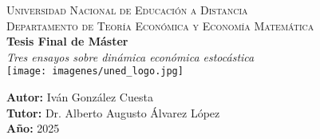 \documentclass[a4paper,12pt]{article}
\begin{document}
	
	\begin{titlepage}
		\centering
		
		\textsc{\LARGE Universidad Nacional de Educación a Distancia}\\[1cm]
		
		\textsc{\Large Departamento de Teoría Económica y Economía Matemática}\\[2.5cm]
		
		{\Huge \bfseries Tesis Final de Máster}\\[0.5cm]
		
		{\huge \itshape Tres ensayos sobre dinámica económica estocástica
			}\\[3cm]
		
		\texttt{[image: imagenes/uned\_logo.jpg]}\\[2cm]  %
		
		\vfill
		
		\begin{flushright}
			\textbf{Autor:} Iván González Cuesta\\[0.2cm]
			\textbf{Tutor:} Dr. Alberto Augusto Álvarez López\\[0.2cm]
			\textbf{Año:} 2025
		\end{flushright}
		
		\vspace{1cm} %
	\end{titlepage}
	
\end{document}
